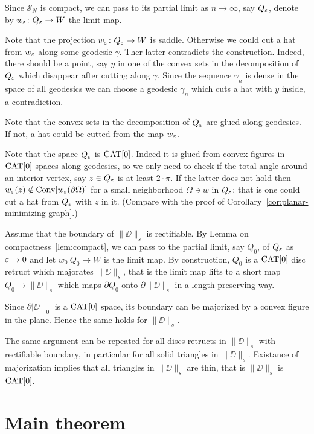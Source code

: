 \documentclass[a4paper,10pt]{amsart}
\begin{document}
Since $\mathcal{S}_N$ is compact, we can pass to its partial limit as $n\to\infty$,
say $Q_\varepsilon$,
denote by $w_\varepsilon\colon Q_\varepsilon\to W$ the limit map.

Note that the projection $w_\varepsilon\colon Q_\varepsilon\to W$ is saddle.
Otherwise we could cut a hat from $w_\varepsilon$ along some geodesic $\gamma$.
Ther latter contradicts the construction.
Indeed, there should be a point, say $y$ in one of the convex sets in the decomposition of $Q_\varepsilon$ which disappear after cutting along $\gamma$.
Since the sequence $\gamma_n$ is dense in the space of all geodesics
we can choose a geodesic $\gamma_n$ which cuts a hat with $y$ inside, a contradiction.

Note that the convex sets in the decomposition of $Q_\varepsilon$ are glued along geodesics.
If not, a hat could be cutted from the map $w_\varepsilon$.

Note that the space $Q_\varepsilon$ is $\mathop{\rm CAT}\nolimits[0]$. 
Indeed it is glued from convex figures in $\mathop{\rm CAT}\nolimits[0]$ spaces along geodesics,
so we only need to check if the total angle around an interior vertex, say $z\in Q_\varepsilon$ is at least $2\cdot\pi$.
If the latter does not hold then 
$w_\varepsilon(z)\notin\mathop{\rm Conv}\nolimits [w_\varepsilon (\partial\Omega)]$
for a small neighborhood $\Omega\ni w$ in $Q_\varepsilon$;
that is one could cut a hat from $Q_\varepsilon$ with $z$ in it.
(Compare with the proof of Corollary~\ref{cor:planar-minimizing-graph}.)

Assume that the boundary of $\|\DD\|_s$ is rectifiable.
By Lemma on compactness~\ref{lem:compact},
we can pass to the partial limit, say $Q_0$, of $Q_\varepsilon$ as $\varepsilon\to 0$ and let $w_0\:Q_0\to W$ is the limit map.
By construction, $Q_0$ is a $\mathop{\rm CAT}\nolimits[0]$ disc retruct which majorates $\|\DD\|_s$,
that is the limit map lifts to a short map $Q_0\to \|\DD\|_s$ which maps $\partial Q_0$ onto  $\partial \|\DD\|_s$ in a length-preserving way.

Since $\partial |\DD\|_0$ is a $\mathop{\rm CAT}\nolimits[0]$ space, its boundary can be majorized by a convex figure in the plane.
Hence the same holds for $\|\DD\|_s$.

The same argument can be repeated for all discs retructs in $\|\DD\|_s$ with rectifiable boundary, in particular for all solid triangles in $\|\DD\|_s$.
Existance of majorization implies that all triangles in $\|\DD\|_s$ are thin, that is $\|\DD\|_s$ is $\mathop{\rm CAT}\nolimits[0]$.
\qeds

\section{Main theorem}
\end{document}
